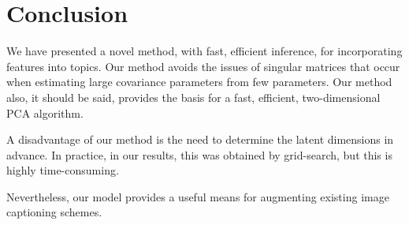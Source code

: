 \section{Conclusion}
We have presented a novel method, with fast, efficient inference, for incorporating features into topics. Our method avoids the issues of singular matrices that occur when estimating large covariance parameters from few parameters. Our method also, it should be said, provides the basis for a fast, efficient, two-dimensional PCA algorithm.

A disadvantage of our method is the need to determine the latent dimensions in advance. In practice, in our results, this was obtained by grid-search, but this is highly time-consuming.

Nevertheless, our model provides a useful means for augmenting existing image captioning schemes.

